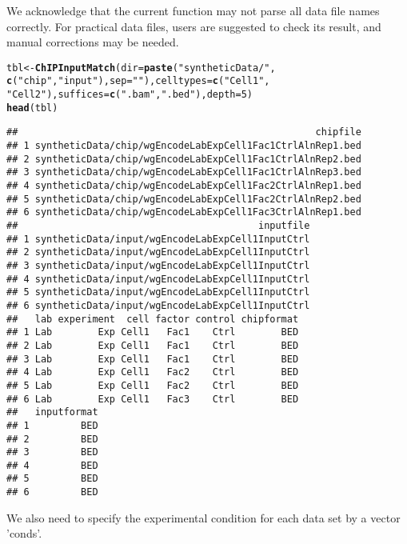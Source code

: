 \documentclass[a4paper,10pt]{article}\usepackage[]{graphicx}\usepackage[]{color}
\makeatletter
\newcommand{\hlnum}[1]{\textcolor[rgb]{0.686,0.059,0.569}{#1}}%
\newcommand{\hlstr}[1]{\textcolor[rgb]{0.192,0.494,0.8}{#1}}%
\newcommand{\hlstd}[1]{\textcolor[rgb]{0.345,0.345,0.345}{#1}}%
\newcommand{\hlkwb}[1]{\textcolor[rgb]{0.69,0.353,0.396}{#1}}%
\newcommand{\hlkwc}[1]{\textcolor[rgb]{0.333,0.667,0.333}{#1}}%
\newcommand{\hlkwd}[1]{\textcolor[rgb]{0.737,0.353,0.396}{\textbf{#1}}}%
\newenvironment{kframe}{%
 \def\at@end@of@kframe{}%
 \ifinner\ifhmode%
  \def\at@end@of@kframe{\end{minipage}}%
  \begin{minipage}{\columnwidth}%
 \fi\fi%
 \def\FrameCommand##1{\hskip\@totalleftmargin \hskip-\fboxsep
 \colorbox{shadecolor}{##1}\hskip-\fboxsep
     \hskip-\linewidth \hskip-\@totalleftmargin \hskip\columnwidth}%
 \MakeFramed {\advance\hsize-\width
   \@totalleftmargin\z@ \linewidth\hsize
   \@setminipage}}%
 {\par\unskip\endMakeFramed%
 \at@end@of@kframe}
\newenvironment{knitrout}{}{} %
\makeatother
\begin{document}
We acknowledge that the current function may not parse all data file names correctly. For practical data files, users are suggested to check its result, and manual corrections may be needed.

\begin{knitrout}
\color{fgcolor}\begin{kframe}
\begin{alltt}
\hlstd{tbl} \hlkwb{<-} \hlkwd{ChIPInputMatch}\hlstd{(}\hlkwc{dir} \hlstd{=} \hlkwd{paste}\hlstd{(}\hlstr{"syntheticData/"}\hlstd{,}
    \hlkwd{c}\hlstd{(}\hlstr{"chip"}\hlstd{,} \hlstr{"input"}\hlstd{),} \hlkwc{sep} \hlstd{=} \hlstr{""}\hlstd{),} \hlkwc{celltypes} \hlstd{=} \hlkwd{c}\hlstd{(}\hlstr{"Cell1"}\hlstd{,}
    \hlstr{"Cell2"}\hlstd{),} \hlkwc{suffices} \hlstd{=} \hlkwd{c}\hlstd{(}\hlstr{".bam"}\hlstd{,} \hlstr{".bed"}\hlstd{),} \hlkwc{depth} \hlstd{=} \hlnum{5}\hlstd{)}
\hlkwd{head}\hlstd{(tbl)}
\end{alltt}
\begin{verbatim}
##                                                    chipfile
## 1 syntheticData/chip/wgEncodeLabExpCell1Fac1CtrlAlnRep1.bed
## 2 syntheticData/chip/wgEncodeLabExpCell1Fac1CtrlAlnRep2.bed
## 3 syntheticData/chip/wgEncodeLabExpCell1Fac1CtrlAlnRep3.bed
## 4 syntheticData/chip/wgEncodeLabExpCell1Fac2CtrlAlnRep1.bed
## 5 syntheticData/chip/wgEncodeLabExpCell1Fac2CtrlAlnRep2.bed
## 6 syntheticData/chip/wgEncodeLabExpCell1Fac3CtrlAlnRep1.bed
##                                          inputfile
## 1 syntheticData/input/wgEncodeLabExpCell1InputCtrl
## 2 syntheticData/input/wgEncodeLabExpCell1InputCtrl
## 3 syntheticData/input/wgEncodeLabExpCell1InputCtrl
## 4 syntheticData/input/wgEncodeLabExpCell1InputCtrl
## 5 syntheticData/input/wgEncodeLabExpCell1InputCtrl
## 6 syntheticData/input/wgEncodeLabExpCell1InputCtrl
##   lab experiment  cell factor control chipformat
## 1 Lab        Exp Cell1   Fac1    Ctrl        BED
## 2 Lab        Exp Cell1   Fac1    Ctrl        BED
## 3 Lab        Exp Cell1   Fac1    Ctrl        BED
## 4 Lab        Exp Cell1   Fac2    Ctrl        BED
## 5 Lab        Exp Cell1   Fac2    Ctrl        BED
## 6 Lab        Exp Cell1   Fac3    Ctrl        BED
##   inputformat
## 1         BED
## 2         BED
## 3         BED
## 4         BED
## 5         BED
## 6         BED
\end{verbatim}
\end{kframe}
\end{knitrout}

We also need to specify the experimental condition for each data set by a vector 'conds'.
\end{document}
